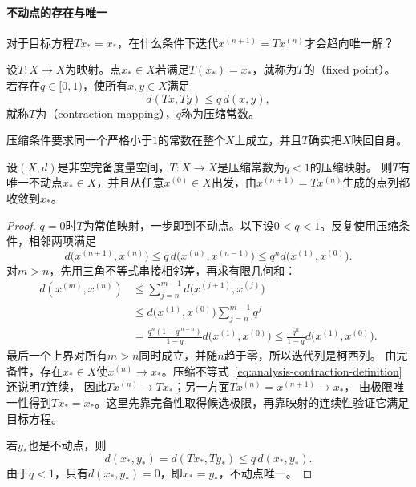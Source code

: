 \paragraph{不动点的存在与唯一}

对于目标方程$Tx_*=x_*$，在什么条件下迭代$x^{(n+1)}=Tx^{(n)}$才会趋向唯一解？

\begin{definition}[不动点与压缩映射]
\label{def:analysis-fixed-point}
设$T:X\to X$为映射。点$x_*\in X$若满足$T(x_*)=x_*$，就称为$T$的（fixed point）。
若存在$q\in[0,1)$，使所有$x,y\in X$满足
\begin{equation}
\label{eq:analysis-contraction-definition}
  d(Tx,Ty)\leq q\,d(x,y),
\end{equation}
就称$T$为（contraction mapping），$q$称为压缩常数。
\end{definition}

压缩条件要求同一个严格小于$1$的常数在整个$X$上成立，并且$T$确实把$X$映回自身。

\begin{theorem}[Banach压缩映射定理]
\label{thm:analysis-banach-fixed-point}
设$(X,d)$是非空完备度量空间，$T:X\to X$是压缩常数为$q<1$的压缩映射。
则$T$有唯一不动点$x_*\in X$，并且从任意$x^{(0)}\in X$出发，由$x^{(n+1)}=Tx^{(n)}$生成的点列都收敛到$x_*$。
\end{theorem}

\begin{proof}
$q=0$时$T$为常值映射，一步即到不动点。以下设$0<q<1$。反复使用压缩条件，相邻两项满足
\[
  d\bigl(x^{(n+1)},x^{(n)}\bigr)
  \leq q\,d\bigl(x^{(n)},x^{(n-1)}\bigr)
  \leq q^n d\bigl(x^{(1)},x^{(0)}\bigr).
\]
对$m>n$，先用三角不等式串接相邻差，再求有限几何和：
\begin{align*}
  d(x^{(m)},x^{(n)})
  &\leq\sum_{j=n}^{m-1}d\bigl(x^{(j+1)},x^{(j)}\bigr)\\
  &\leq d\bigl(x^{(1)},x^{(0)}\bigr)\sum_{j=n}^{m-1}q^j\\
  &=\frac{q^n(1-q^{m-n})}{1-q}d\bigl(x^{(1)},x^{(0)}\bigr)
  \leq\frac{q^n}{1-q}d\bigl(x^{(1)},x^{(0)}\bigr).
\end{align*}
最后一个上界对所有$m>n$同时成立，并随$n$趋于零，所以迭代列是柯西列。
由完备性，存在$x_*\in X$使$x^{(n)}\to x_*$。压缩不等式~\eqref{eq:analysis-contraction-definition}还说明$T$连续，
因此$Tx^{(n)}\to Tx_*$；另一方面$Tx^{(n)}=x^{(n+1)}\to x_*$，
由极限唯一性得到$Tx_*=x_*$。这里先靠完备性取得候选极限，再靠映射的连续性验证它满足目标方程。

若$y_*$也是不动点，则
\[
  d(x_*,y_*)=d(Tx_*,Ty_*)\leq q\,d(x_*,y_*).
\]
由于$q<1$，只有$d(x_*,y_*)=0$，即$x_*=y_*$，不动点唯一。
\end{proof}

